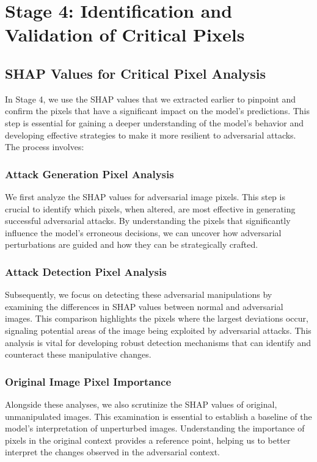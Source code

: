 \documentclass[10pt, conference, a4paper, final]{IEEEtran}
\begin{document}
    
\section{Stage 4: Identification and Validation of Critical Pixels}

\subsection{SHAP Values for Critical Pixel Analysis}
    In Stage 4, we use the SHAP values that we extracted earlier to pinpoint and confirm the pixels that have a significant impact on the 
    model's predictions. This step is essential for gaining a deeper understanding of the model's behavior and developing effective strategies 
    to make it more resilient to adversarial attacks.
    The process involves:

 \subsubsection{Attack Generation Pixel Analysis}
We first analyze the SHAP values for adversarial image pixels. This step is crucial to identify which pixels, when altered, are most effective 
in generating successful adversarial attacks. By understanding the pixels that significantly influence the model's erroneous decisions, we can 
uncover how adversarial perturbations are guided and how they can be strategically crafted.

\subsubsection{Attack Detection Pixel Analysis}
Subsequently, we focus on detecting these adversarial manipulations by examining the differences in SHAP values between normal and adversarial
images. This comparison highlights the pixels where the largest deviations occur, signaling potential areas of the image being exploited by 
adversarial attacks. This analysis is vital for developing robust detection mechanisms that can identify and counteract these manipulative 
changes.

\subsubsection{Original Image Pixel Importance}
Alongside these analyses, we also scrutinize the SHAP values of original, unmanipulated images. This examination is essential to establish a 
baseline of the model’s interpretation of unperturbed images. Understanding the importance of pixels in the original context provides a 
reference point, helping us to better interpret the changes observed in the adversarial context.
\end{document}
